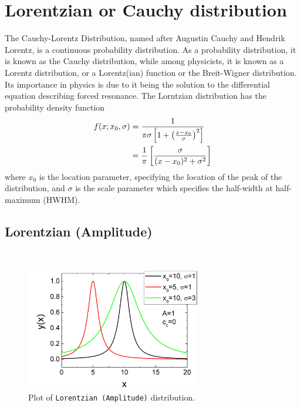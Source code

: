 \clearpage
\section{Lorentzian or Cauchy distribution}
\label{sec:Lorentzian}

The Cauchy-Lorentz Distribution, named after
Augustin Cauchy and Hendrik Lorentz, is a continuous probability
distribution. As a probability distribution, it is known as the
Cauchy distribution, while among physicists, it is known as a
Lorentz distribution, or a Lorentz(ian) function or the Breit-Wigner
distribution. Its importance in physics is due to it being the solution to the
differential equation describing forced resonance. The Lorntzian
distribution has the probability density function
\begin{align}
 f(x; x_0,\sigma)&= \frac{1}{\pi\sigma \left[1 + \left(\frac{x-x_0}{\sigma}\right)^2\right]} \nonumber \\
                 &= { 1 \over \pi } \left[ { \sigma \over (x - x_0)^2 + \sigma^2 } \right]
\end{align}
where $x_0$ is the location parameter, specifying the location of the
peak of the distribution, and $\sigma$ is the scale parameter which
specifies the half-width at half-maximum (HWHM).

\vspace{5mm}

\subsection{Lorentzian (Amplitude)} ~\\
\label{sec:LorentzianAmplitude}
\begin{figure}[htb]
\begin{center}
\includegraphics[width=0.6824\textwidth]{LorentzianAmplitude.png}
\end{center}
\caption{Plot of \texttt{Lorentzian (Amplitude)} distribution.}
\label{fig:LorentzianAmplitude}
\end{figure}
\clearpage
